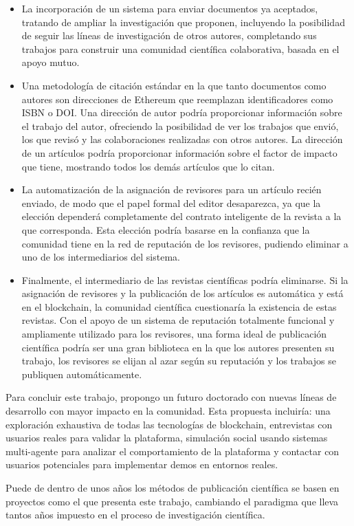\begin{itemize}
\item La incorporación de un sistema para enviar documentos ya aceptados,
  tratando de ampliar la investigación que proponen, incluyendo la posibilidad
  de seguir las líneas de investigación de otros autores, completando sus
  trabajos para construir una comunidad científica colaborativa, basada en el
  apoyo mutuo.
\item Una metodología de citación estándar en la que tanto documentos como
  autores son direcciones de Ethereum que reemplazan identificadores como ISBN o
  DOI. Una dirección de autor podría proporcionar información sobre el trabajo
  del autor, ofreciendo la posibilidad de ver los trabajos que envió, los que
  revisó y las colaboraciones realizadas con otros autores. La dirección de un
  artículos podría proporcionar información sobre el factor de impacto que
  tiene, mostrando todos los demás artículos que lo citan.
\item La automatización de la asignación de revisores para un artículo recién
  enviado, de modo que el papel formal del editor desaparezca, ya que la
  elección dependerá completamente del contrato inteligente de la revista a la
  que corresponda. Esta elección podría basarse en la confianza que la comunidad
  tiene en la red de reputación de los revisores, pudiendo eliminar a uno de los
  intermediarios del sistema.
\item Finalmente, el intermediario de las revistas científicas podría
  eliminarse. Si la asignación de revisores y la publicación de los artículos es
  automática y está en el blockchain, la comunidad científica cuestionaría la
  existencia de estas revistas. Con el apoyo de un sistema de reputación
  totalmente funcional y ampliamente utilizado para los revisores, una forma
  ideal de publicación científica podría ser una gran biblioteca en la que los
  autores presenten su trabajo, los revisores se elijan al azar según su
  reputación y los trabajos se publiquen automáticamente.
\end{itemize}

Para concluir este trabajo, propongo un futuro doctorado con nuevas líneas de
desarrollo con mayor impacto en la comunidad. Esta propuesta incluiría: una
exploración exhaustiva de todas las tecnologías de blockchain, entrevistas con
usuarios reales para validar la plataforma, simulación social usando sistemas
multi-agente para analizar el comportamiento de la plataforma y contactar con
usuarios potenciales para implementar demos en entornos reales.

Puede de dentro de unos años los métodos de publicación científica se basen en
proyectos como el que presenta este trabajo, cambiando el paradigma que lleva
tantos años impuesto en el proceso de investigación científica.
